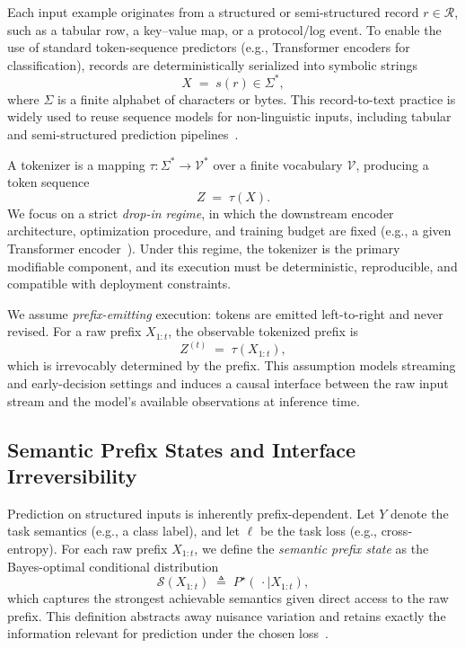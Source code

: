 Each input example originates from a structured or semi-structured record $r \in \mathcal{R}$, such as a tabular row, a key--value map, or a protocol/log event.
To enable the use of standard token-sequence predictors (e.g., Transformer encoders for classification), records are deterministically serialized into symbolic strings
\begin{equation}
X \;=\; s(r) \in \Sigma^\ast,
\label{eq:serialization}
\end{equation}
where $\Sigma$ is a finite alphabet of characters or bytes.
This record-to-text practice is widely used to reuse sequence models for non-linguistic inputs, including tabular and semi-structured prediction pipelines~\cite{yin2020tabert,herzig2020tapas}.

A tokenizer is a mapping $\tau : \Sigma^\ast \rightarrow \mathcal{V}^\ast$ over a finite vocabulary $\mathcal{V}$, producing a token sequence
\[
Z \;=\; \tau(X).
\]
We focus on a strict \emph{drop-in regime}, in which the downstream encoder architecture, optimization procedure, and training budget are fixed (e.g., a given Transformer encoder~\cite{vaswani2017attention,devlin2019bert}).
Under this regime, the tokenizer is the primary modifiable component, and its execution must be deterministic, reproducible, and compatible with deployment constraints.

We assume \emph{prefix-emitting} execution: tokens are emitted left-to-right and never revised.
For a raw prefix $X_{1:t}$, the observable tokenized prefix is
\begin{equation}
Z^{(t)} \;=\; \tau(X_{1:t}),
\label{eq:prefix_tok}
\end{equation}
which is irrevocably determined by the prefix.
This assumption models streaming and early-decision settings and induces a causal interface between the raw input stream and the model's available observations at inference time.

\subsection{Semantic Prefix States and Interface Irreversibility}
\label{sec:semantic_state}

Prediction on structured inputs is inherently prefix-dependent.
Let $Y$ denote the task semantics (e.g., a class label), and let $\ell$ be the task loss (e.g., cross-entropy).
For each raw prefix $X_{1:t}$, we define the \emph{semantic prefix state} as the Bayes-optimal conditional distribution
\begin{equation}
\mathcal{S}(X_{1:t})
\;\triangleq\;
P^\star(\,\cdot \mid X_{1:t}),
\label{eq:semantic_raw}
\end{equation}
which captures the strongest achievable semantics given direct access to the raw prefix.
This definition abstracts away nuisance variation and retains exactly the information relevant for prediction under the chosen loss~\cite{cover1999elements,tishby2000information}.

